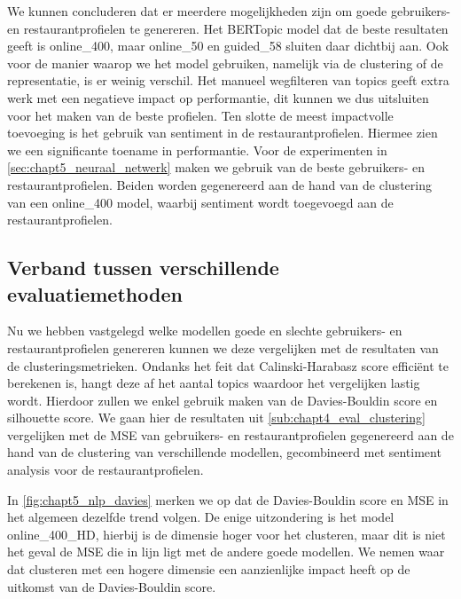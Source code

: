 We kunnen concluderen dat er meerdere mogelijkheden zijn om goede gebruikers- en restaurantprofielen te genereren. Het BERTopic model dat de beste resultaten geeft is online\_400, maar online\_50 en guided\_58 sluiten daar dichtbij aan. Ook voor de manier waarop we het model gebruiken, namelijk via de clustering of de representatie, is er weinig verschil. Het manueel wegfilteren van topics geeft extra werk met een negatieve impact op performantie, dit kunnen we dus uitsluiten voor het maken van de beste profielen. Ten slotte de meest impactvolle toevoeging is het gebruik van sentiment in de restaurantprofielen. Hiermee zien we een significante toename in performantie. \newline
Voor de experimenten in \autoref{sec:chapt5_neuraal_netwerk} maken we gebruik van de beste gebruikers- en restaurantprofielen. Beiden worden gegenereerd aan de hand van de clustering van een online\_400 model, waarbij sentiment wordt toegevoegd aan de restaurantprofielen. %

\subsection{Verband tussen verschillende evaluatiemethoden}
\label{sub:chapt5_compare_eval_methods}
Nu we hebben vastgelegd welke modellen goede en slechte gebruikers- en restaurantprofielen genereren kunnen we deze vergelijken met de resultaten van de clusteringsmetrieken. Ondanks het feit dat Calinski-Harabasz score efficiënt te berekenen is, hangt deze af het aantal topics waardoor het vergelijken lastig wordt. Hierdoor zullen we enkel gebruik maken van de Davies-Bouldin score en silhouette score. We gaan hier de resultaten uit \autoref{sub:chapt4_eval_clustering} vergelijken met de MSE van gebruikers- en restaurantprofielen gegenereerd aan de hand van de clustering van verschillende modellen, gecombineerd met sentiment analysis voor de restaurantprofielen. 


In \autoref{fig:chapt5_nlp_davies} merken we op dat de Davies-Bouldin score en MSE in het algemeen dezelfde trend volgen. De enige uitzondering is het model online\_400\_HD, hierbij is de dimensie hoger voor het clusteren, maar dit is niet het geval de MSE die in lijn ligt met de andere goede modellen. We nemen waar dat clusteren met een hogere dimensie een aanzienlijke impact heeft op de uitkomst van de Davies-Bouldin score. 

